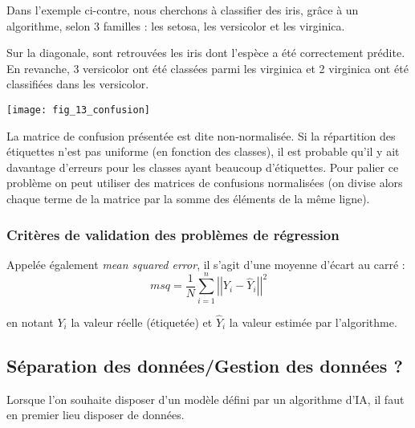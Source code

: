 \begin{exemple}
Dans l'exemple ci-contre, nous cherchons à classifier des iris, grâce à un algorithme, selon 3 familles : les setosa, les versicolor et les virginica. 

Sur la diagonale, sont retrouvées les iris dont l'espèce a été correctement prédite. En revanche, 3 versicolor ont été classées parmi les virginica et 2 virginica ont été classifiées dans les versicolor. 
\end{exemple}

\begin{marginfigure}
\texttt{[image: fig\_13\_confusion]}
\end{marginfigure}

\begin{remarque}
La matrice de confusion présentée est dite non-normalisée. Si la répartition des étiquettes n'est pas uniforme (en fonction des classes), il est probable qu'il y ait davantage d'erreurs pour les classes ayant beaucoup d'étiquettes. Pour palier ce problème on peut utiliser des matrices de confusions normalisées (on divise alors chaque terme de la matrice par la somme des éléments de la même ligne).
\end{remarque}

\subsubsection{Critères de validation des problèmes de régression}
\begin{defi}
Appelée également \textit{mean squared error}, il s'agit d'une moyenne d'écart au carré : 
$$
msq = \dfrac{1}{N} \sum\limits_{i=1}^n \left|\left|Y_i - \hat{Y}_i \right|\right|^2
$$
 
 en notant $Y_i$ la valeur réelle (étiquetée) et $ \hat{Y}_i$ la valeur estimée par l'algorithme.
\end{defi}


\subsection{Séparation des données/Gestion des données ?}
Lorsque l'on souhaite disposer d'un modèle défini par un algorithme d'IA, il faut en premier lieu disposer de données. 

